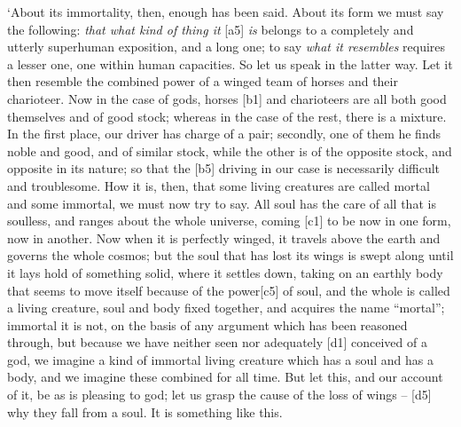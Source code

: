 ‘About its immortality, then, enough has been said. About its form we
must say the following: {\em that what kind of thing it} {[}a5{]}
{\em is} belongs to a completely and utterly
superhuman exposition,
and a long one; to say {\em what it resembles} requires a lesser one,
one within human capacities. So let us speak in the latter way. Let it
then resemble the
combined power of a
winged team of horses and their charioteer. Now in the case of gods,
horses {[}b1{]} and charioteers are all both good themselves and of good
stock; whereas in the case of the rest, there is a mixture. In the first
place, our driver has
charge of a pair; secondly, one of them he finds noble and good, and of
similar stock, while the other is of the opposite stock, and opposite in
its nature; so that the {[}b5{]} driving in our case is necessarily
difficult and troublesome. How it is, then, that some living creatures
are called mortal and some immortal, we must now try to say. All soul
has the care of all that is soulless, and ranges about the whole
universe, coming {[}c1{]} to be now in one form, now in another. Now
when it is perfectly winged, it travels above the earth and governs the
whole cosmos; but the soul that has lost its wings is swept along until
it lays hold of something solid, where it settles down, taking on an
earthly body that seems to move itself because of the power{[}c5{]} of
soul, and the whole is called a living creature, soul and body fixed
together, and acquires the name “mortal”; immortal it is not, on the
basis of any argument which has been reasoned through, but because we
have neither seen nor adequately {[}d1{]} conceived of a god, we imagine
a kind of immortal living creature which has a soul and has a body, and
we imagine these combined for all time. But let this, and our account of
it, be as is pleasing to
god; let us grasp the
cause of the loss of wings -- {[}d5{]} why they fall from a soul. It is
something like this.

